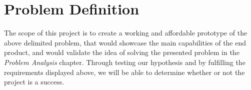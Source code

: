 \section{Problem Definition}

The scope of this project is to create a working and affordable prototype of the above delimited problem, that would showcase the main capabilities of the end product, and would validate the idea of solving the presented problem in the \textit{Problem Analysis} chapter.
Through testing our hypothesis and by fulfilling the requirements displayed above, we will be able to determine whether or not the project is a success.
